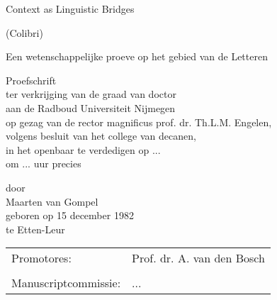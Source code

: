 \documentclass[11pt,makeidx,english]{style/phdthesis}
\author{Maarten van Gompel}
\theoremstyle{break}
\begin{document}
\frontmatter

\pagestyle{plain}



\begin{titlepage}
\begin{center}
\vspace{8cm}
{\Huge Context as Linguistic Bridges}

\vspace{0.5cm}

{\LARGE (Colibri)}

\vspace{1cm}
Een wetenschappelijke proeve op het gebied van de Letteren

\vspace{6cm}
{\LARGE Proefschrift }\\
\vspace{1cm}
ter verkrijging van de graad van doctor\\
aan de Radboud Universiteit Nijmegen\\
op gezag van de rector magnificus prof. dr. Th.L.M. Engelen,\\
volgens besluit van het college van decanen,\\
in het openbaar te verdedigen op ... \\
om ... uur precies\\

\vspace{2cm}

door\\
\vspace{1cm}
{\LARGE Maarten van Gompel}\\
\vspace{0.5cm}
geboren op 15 december 1982\\
te Etten-Leur


\vspace{0.5cm}


\end{center}

\clearpage

\thispagestyle{empty}
\begin{tabular}{ll}
Promotores: & Prof. dr. A. van den Bosch \\
 & \\
Manuscriptcommissie: & ... \\
\end{tabular}
\end{titlepage}


\tableofcontents


%

\mainmatter
\pagestyle{headings}













\end{document}
